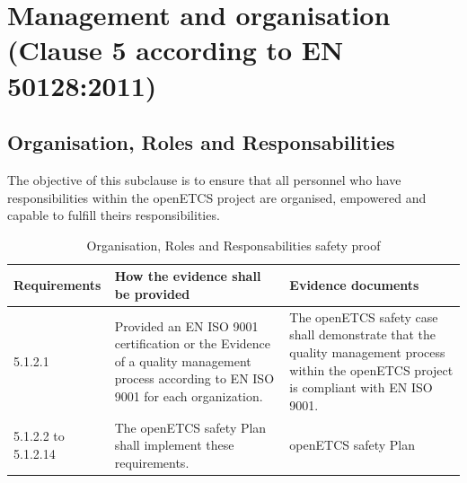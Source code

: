 \documentclass{template/openetcs_report}
\begin{document}
\section{Management and organisation (Clause 5 according to EN 50128:2011)}
\label{clause52}
\subsection{Organisation, Roles and Responsabilities}
\begin{flushleft}
The objective of this subclause is to ensure that all personnel who have responsibilities within the openETCS project are organised, empowered and capable to fulfill theirs responsibilities.
\end{flushleft}
{\footnotesize\sffamily\centering
\begin{longtable}{|p{2cm}|p{9cm}|p{3cm}|}
\caption{Organisation, Roles and Responsabilities safety proof}\\
\hline
\bfseries Requirements & \bfseries How the evidence shall be provided & \bfseries Evidence documents\\
\hline
\hline
\endhead
\hline
\endfoot

5.1.2.1 & Provided an EN ISO 9001 certification or the Evidence of a quality management process according to EN ISO 9001 for each organization. & The openETCS safety case shall demonstrate that the quality management process within the openETCS project is compliant with EN ISO 9001.\\ 
\hline
5.1.2.2 to 5.1.2.14 & The openETCS safety Plan shall implement these requirements.& openETCS safety Plan\\ 
\hline
\end{longtable}}
\end{document}
